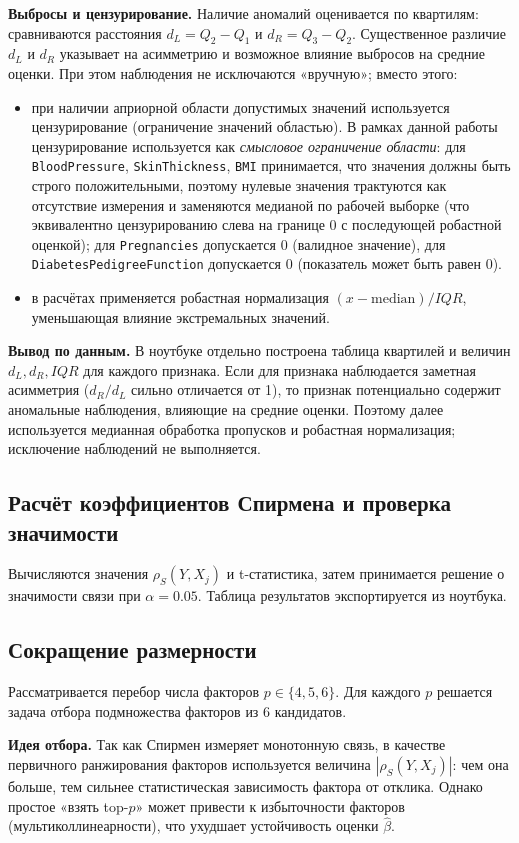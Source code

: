 \documentclass[a4paper, 14pt]{extarticle}
\begin{document}
\medskip
\textbf{Выбросы и цензурирование.} Наличие аномалий оценивается по квартилям: сравниваются расстояния
\(d_L=Q_2-Q_1\) и \(d_R=Q_3-Q_2\). Существенное различие \(d_L\) и \(d_R\) указывает на асимметрию и
возможное влияние выбросов на средние оценки. При этом наблюдения не исключаются «вручную»; вместо этого:
\begin{itemize}
  \item при наличии априорной области допустимых значений используется цензурирование (ограничение значений областью).
  В рамках данной работы цензурирование используется как \textit{смысловое ограничение области}:
  для \texttt{BloodPressure}, \texttt{SkinThickness}, \texttt{BMI} принимается, что значения должны быть строго положительными,
  поэтому нулевые значения трактуются как отсутствие измерения и заменяются медианой по рабочей выборке (что эквивалентно
  цензурированию слева на границе 0 с последующей робастной оценкой);
  для \texttt{Pregnancies} допускается 0 (валидное значение), для \texttt{DiabetesPedigreeFunction} допускается 0 (показатель может быть равен 0).
  \item в расчётах применяется робастная нормализация \((x-\mathrm{median})/IQR\), уменьшающая влияние экстремальных значений.
\end{itemize}
\textbf{Вывод по данным.} В ноутбуке отдельно построена таблица квартилей и величин \(d_L,d_R,IQR\) для каждого признака.
Если для признака наблюдается заметная асимметрия (\(d_R/d_L\) сильно отличается от 1), то признак потенциально содержит
аномальные наблюдения, влияющие на средние оценки. Поэтому далее используется медианная обработка пропусков и робастная
нормализация; исключение наблюдений не выполняется.

\subsection{Расчёт коэффициентов Спирмена и проверка значимости}
Вычисляются значения $\rho_S(Y,X_j)$ и t-статистика, затем принимается решение о значимости связи
при $\alpha=0.05$. Таблица результатов экспортируется из ноутбука.

\subsection{Сокращение размерности}
Рассматривается перебор числа факторов $p\in\{4,5,6\}$. Для каждого $p$ решается задача отбора подмножества факторов из 6 кандидатов.

\medskip
\textbf{Идея отбора.} Так как Спирмен измеряет монотонную связь, в качестве первичного ранжирования факторов используется величина $|\rho_S(Y,X_j)|$: чем она больше, тем сильнее статистическая зависимость фактора от отклика. Однако простое «взять top-$p$» может привести к избыточности факторов (мультиколлинеарности), что ухудшает устойчивость оценки $\hat{\beta}$.
\end{document}
